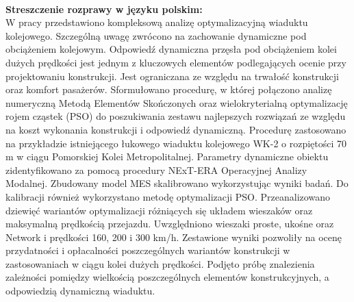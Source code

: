 \begin{myfont}
	\pagebreak[4]
	
	\noindent
	\\
	\textbf{Streszczenie rozprawy w języku polskim:}\\
	W pracy przedstawiono kompleksową analizę optymalizacyjną wiaduktu kolejowego. Szczególną uwagę zwrócono na zachowanie dynamiczne pod obciążeniem kolejowym. Odpowiedź dynamiczna przęsła pod obciążeniem kolei dużych prędkości jest jednym z kluczowych elementów podlegających ocenie przy projektowaniu konstrukcji. Jest ograniczana ze względu na trwałość konstrukcji oraz komfort pasażerów. Sformułowano procedurę, w której połączono analizę numeryczną Metodą Elementów Skończonych oraz wielokryterialną optymalizację rojem cząstek (PSO) do poszukiwania zestawu najlepszych rozwiązań ze względu na koszt wykonania konstrukcji i odpowiedź dynamiczną. Procedurę zastosowano na przykładzie istniejącego łukowego wiaduktu kolejowego WK-2 o rozpiętości 70 m w ciągu Pomorskiej Kolei Metropolitalnej. Parametry dynamiczne obiektu zidentyfikowano za pomocą procedury NExT-ERA Operacyjnej Analizy Modalnej. Zbudowany model MES skalibrowano wykorzystując wyniki badań. Do kalibracji również wykorzystano metodę optymalizacji PSO. Przeanalizowano dziewięć wariantów optymalizacji różniących się układem wieszaków oraz maksymalną prędkością przejazdu. Uwzględniono wieszaki proste, ukośne oraz Network i prędkości 160, 200 i 300 km/h. Zestawione wyniki pozwoliły na ocenę przydatności i opłacalności poszczególnych wariantów konstrukcji w zastosowaniach w ciągu kolei dużych prędkości. Podjęto próbę znalezienia zależności pomiędzy wielkością poszczególnych elementów konstrukcyjnych, a odpowiedzią dynamiczną wiaduktu.
	

\end{myfont}
